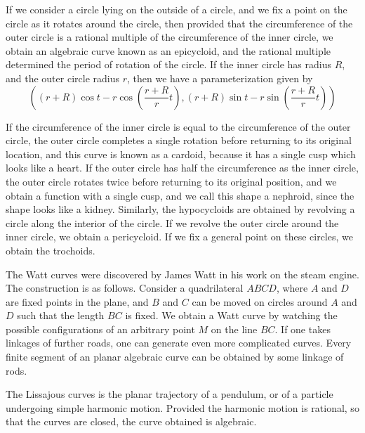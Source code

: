 \begin{example}
    If we consider a circle lying on the outside of a circle, and we fix a point on the circle as it rotates around the circle, then provided that the circumference of the outer circle is a rational multiple of the circumference of the inner circle, we obtain an algebraic curve known as an epicycloid, and the rational multiple determined the period of rotation of the circle. If the inner circle has radius $R$, and the outer circle radius $r$, then we have a parameterization given by
    \[ \left( (r + R) \cos t - r \cos \left(\frac{r + R}{r}t \right), (r + R) \sin t - r \sin \left( \frac{r + R}{r}t \right) \right) \]



    If the circumference of the inner circle is equal to the circumference of the outer circle, the outer circle completes a single rotation before returning to its original location, and this curve is known as a cardoid, because it has a single cusp which looks like a heart. If the outer circle has half the circumference as the inner circle, the outer circle rotates twice before returning to its original position, and we obtain a function with a single cusp, and we call this shape a nephroid, since the shape looks like a kidney. Similarly, the hypocycloids are obtained by revolving a circle along the interior of the circle. If we revolve the outer circle around the inner circle, we obtain a pericycloid. If we fix a general point on these circles, we obtain the trochoids.
\end{example}

\begin{example}
    The Watt curves were discovered by James Watt in his work on the steam engine. The construction is as follows. Consider a quadrilateral $ABCD$, where $A$ and $D$ are fixed points in the plane, and $B$ and $C$ can be moved on circles around $A$ and $D$ such that the length $BC$ is fixed. We obtain a Watt curve by watching the possible configurations of an arbitrary point $M$ on the line $BC$. If one takes linkages of further roads, one can generate even more complicated curves. Every finite segment of an planar algebraic curve can be obtained by some linkage of rods.
\end{example}

\begin{example}
    The Lissajous curves is the planar trajectory of a pendulum, or of a particle undergoing simple harmonic motion. Provided the harmonic motion is rational, so that the curves are closed, the curve obtained is algebraic.
\end{example}

